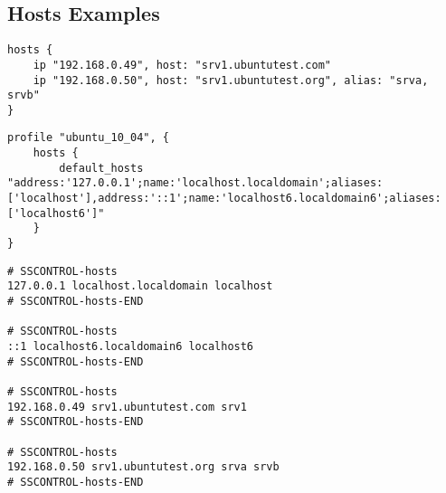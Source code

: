 \subsection{Hosts Examples}

\begin{lstlisting}[style=Sscontrol,
label={lst:hosts_example_script},
title={Adds IP addresses and the host name.}]
hosts {
    ip "192.168.0.49", host: "srv1.ubuntutest.com"
    ip "192.168.0.50", host: "srv1.ubuntutest.org", alias: "srva, srvb"
}
\end{lstlisting}

\begin{lstlisting}[style=Sscontrol,
label={lst:hosts_ubuntu_profile},
title={Sets default list of hosts.}]
profile "ubuntu_10_04", {
    hosts {
        default_hosts "address:'127.0.0.1';name:'localhost.localdomain';aliases:['localhost'],address:'::1';name:'localhost6.localdomain6';aliases:['localhost6']"
    }
}
\end{lstlisting}

\begin{lstlisting}[style=rcfile_nonumbers,
label={lst:hosts_example},
title={Example hosts configuration file. The file is saved as "/etc/hosts".}]
# SSCONTROL-hosts
127.0.0.1 localhost.localdomain localhost
# SSCONTROL-hosts-END

# SSCONTROL-hosts
::1 localhost6.localdomain6 localhost6
# SSCONTROL-hosts-END

# SSCONTROL-hosts
192.168.0.49 srv1.ubuntutest.com srv1
# SSCONTROL-hosts-END

# SSCONTROL-hosts
192.168.0.50 srv1.ubuntutest.org srva srvb
# SSCONTROL-hosts-END
\end{lstlisting}

